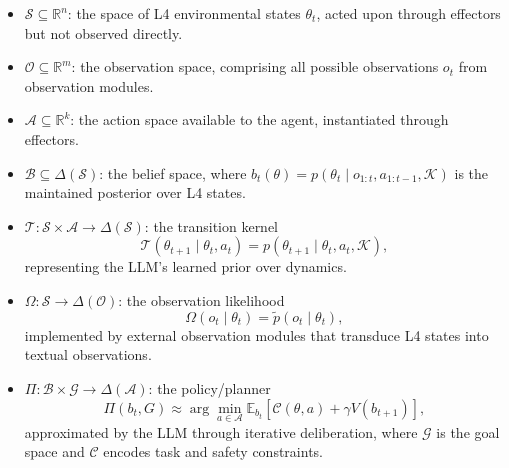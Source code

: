\begin{itemize}
\item \(\mathcal{S} \subseteq \mathbb{R}^n\): the space of L4 environmental states \(\theta_t\), acted upon through effectors but not observed directly.

\item \(\mathcal{O} \subseteq \mathbb{R}^m\): the observation space, comprising all possible observations \(o_t\) from observation modules.

\item \(\mathcal{A} \subseteq \mathbb{R}^k\): the action space available to the agent, instantiated through effectors.

\item \(\mathcal{B} \subseteq \Delta(\mathcal{S})\): the belief space, where \(b_t(\theta) = p(\theta_t \mid o_{1:t}, a_{1:t-1}, \mathcal{K})\) is the maintained posterior over L4 states.

\item \(\mathcal{T}: \mathcal{S} \times \mathcal{A} \to \Delta(\mathcal{S})\): the transition kernel
\begin{equation}
\mathcal{T}(\theta_{t+1} \mid \theta_t, a_t) = p(\theta_{t+1} \mid \theta_t, a_t, \mathcal{K}),
\end{equation}
representing the LLM's learned prior over dynamics.

\item \(\Omega: \mathcal{S} \to \Delta(\mathcal{O})\): the observation likelihood
\begin{equation}
\Omega(o_t \mid \theta_t) = \tilde{p}(o_t \mid \theta_t),
\end{equation}
implemented by external observation modules that transduce L4 states into textual observations.

\item \(\Pi: \mathcal{B} \times \mathcal{G} \to \Delta(\mathcal{A})\): the policy/planner
\begin{equation}
\Pi(b_t, G) \approx \arg\min_{a \in \mathcal{A}} \mathbb{E}_{b_t}[\mathcal{C}(\theta, a) + \gamma V(b_{t+1})],
\end{equation}
approximated by the LLM through iterative deliberation, where \(\mathcal{G}\) is the goal space and \(\mathcal{C}\) encodes task and safety constraints.
\end{itemize}


